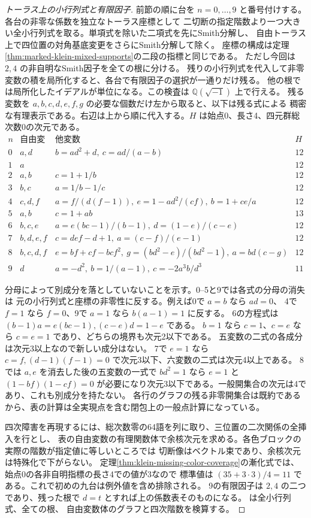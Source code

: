 \begin{proof}[トーラス上の小行列式と有限因子]
前節の順に台を $n=0,\ldots,9$ と番号付けする。各台の非零な係数を独立なトーラス座標として
二切断の指定階数より一つ大きい全小行列式を取る。単項式を除いた二項式を先にSmith分解し、
自由トーラス上で四位置の対角基底変更をさらにSmith分解して除く。
座標の構成は定理\ref{thm:marked-klein-mixed-supports}の二段の指標と同じである。
ただし今回は $2,4$ の非自明なSmith因子を全ての根に分ける。
残りの小行列式を代入して非零変数の積を局所化すると、各台で有限因子の選択が一通りだけ残る。
他の根では局所化したイデアルが単位になる。この検査は $\mathbb Q(\sqrt{-1})$ 上で行える。
残る変数を $a,b,c,d,e,f,g$ の必要な個数だけ左から取ると、以下は残る式による
稠密な有理表示である。右辺は上から順に代入する。$H$ は始点0、長さ4、四元群総次数0の次元である。
\[
\begin{array}{c|l|l|r}
 n&\text{自由変数}&\text{他変数}& H\\\hline
0&a,d&b=ad^2+d,\ c=ad/(a-b)&12\\
1&a& &12\\
2&a,b&c=1+1/b&12\\
3&b,c&a=1/b-1/c&12\\
4&c,d,f&a=f/(d(f-1)),\ e=1-ad^2/(cf),\ b=1+ce/a&12\\
5&a,b&c=1+ab&13\\
6&b,c,e&a=e(bc-1)/(b-1),\ d=(1-e)/(c-e)&12\\
7&b,d,e,f&c=def-d+1,\ a=(c-f)/(e-1)&12\\
8&b,c,d,f&e=bf+cf-bcf^2,\ g=(bd^2-e)/(bd^2-1),\ a=bd(c-g)&12\\
9&d&a=-d^2,\ b=1/(a-1),\ c=-2a^3b/d^3&11
\end{array}
\]

分母によって別成分を落としていないことを示す。0--5と9では各式の分母の消失は
元の小行列式と座標の非零性に反する。例えば0で $a=b$ なら $ad=0$、
4で $f=1$ なら $f=0$、9で $a=1$ なら $b(a-1)=1$ に反する。
6の方程式は $(b-1)a=e(bc-1),(c-e)d=1-e$ である。
$b=1$ なら $c=1$、$c=e$ なら $c=e=1$ であり、どちらの境界も次元2以下である。
五変数の二式の各成分は次元3以上なので新しい成分はない。
7で $e=1$ なら $c=f,(d-1)(f-1)=0$ で次元3以下、六変数の二式は次元4以上である。
8では $a,e$ を消去した後の五変数の一式で $bd^2=1$ なら $e=1$ と
$(1-bf)(1-cf)=0$ が必要になり次元3以下である。一般開集合の次元は4であり、これも別成分を持たない。
各行のグラフの残る非零開集合は既約であるから、表の計算は全実現点を含む閉包上の一般点計算になっている。

四次障害を再現するには、総次数零の64語を列に取り、三位置の二次関係の全挿入を行とし、
表の自由変数の有理関数体で余核次元を求める。各色ブロックの実際の階数が指定値に等しいところでは
切断像はベクトル束であり、余核次元は特殊化で下がらない。
定理\ref{thm:klein-missing-color-coverage}の漸化式では、始点0の各非自明指標の長さ4での値が3なので
標準値は $(35+3\cdot3)/4=11$ である。これで初めの九台は例外値を含め排除される。
9の有限因子は $2,4$ の二つであり、残った根で $d=t$ とすれば上の係数表そのものになる。
 は全小行列式、全ての根、
自由変数体のグラフと四次階数を検算する。
\end{proof}

